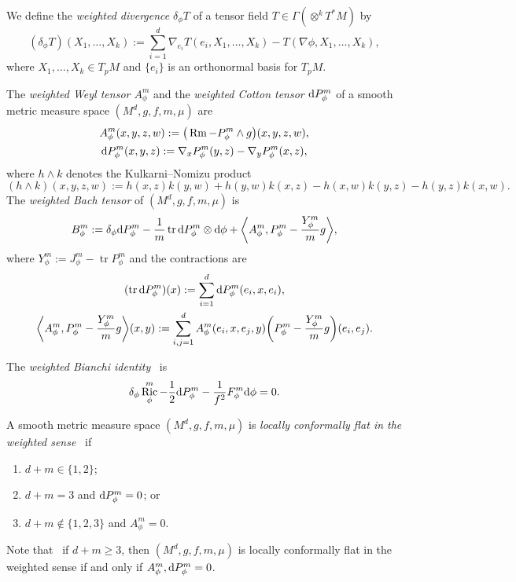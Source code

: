\documentclass[pdftex]{sigma}
\DeclareMathOperator{\tr}{tr}
\DeclareMathOperator{\Ric}{Ric}
\DeclareMathOperator{\Rm}{Rm}
\newcommand{\lp}{\langle}
\newcommand{\rp}{\rangle}
\newcommand{\del}{\delta_{\phi}}
\newcommand{\ric}{\Ric_{\phi}^m}
\numberwithin{equation}{section}
\begin{document}
We define the \emph{weighted divergence} $\delta_\phi T$ of a tensor field $T \in \Gamma(\otimes^k T^*M)$ by
\[
(\delta_\phi T)(X_1,\dots,X_k):=\sum\limits_{i=1}^d \nabla_{e_i} T(e_i,X_1,\dots,X_k)-T(\nabla\phi,X_1,\dots,X_k),
\]
where $X_1,\dots,X_k\in T_p M$ and $\{e_i\}$ is an orthonormal basis for $T_p M$.

The \emph{weighted Weyl tensor $A_\phi^m$} and the \emph{weighted Cotton tensor ${\rm d}P_\phi^m$} of a smooth metric measure space $(M^d,g,f,m,\mu)$ are
\begin{gather*}
 A_\phi^m(x,y,z,w) := \big(\Rm - P_\phi^m \wedge g\big)(x,y,z,w) ,
 \\
 {\rm d}P_\phi^m(x,y,z) := \nabla_x P_\phi^m(y,z) - \nabla_y P_\phi^m(x,z) ,
\end{gather*}
where $h\wedge k$ denotes the Kulkarni--Nomizu product
\[
(h\wedge k)(x,y,z,w) := h(x,z)k(y,w) + h(y,w)k(x,z) - h(x,w)k(y,z) - h(y,z)k(x,w) .
\]
The \emph{weighted Bach tensor} of $(M^d,g,f,m,\mu)$ is
\[
B_\phi^m := \delta_\phi {\rm d}P_\phi^m - \frac{1}{m}\tr {\rm d}P_\phi^m \otimes {\rm d}\phi + \biggl\lp A_\phi^m, P_\phi^m - \frac{Y_\phi^m}{m}g\biggr\rp ,
\]
where $Y_\phi^m := J_\phi^m - \tr P_\phi^m$ and the contractions are
\begin{gather*}
 (\tr {\rm d}P_\phi^m)(x) := \sum_{i=1}^d {\rm d}P_\phi^m(e_i,x,e_i),
 \\
 \biggl\lp A_\phi^m, P_\phi^m - \frac{Y_\phi^m}{m}g\biggr\rp(x,y) := \sum_{i,j=1}^d A_\phi^m(e_i,x,e_j,y)\biggl(P_\phi^m - \frac{Y_\phi^m}{m}g\biggr)(e_i,e_j).
\end{gather*}

The \emph{weighted Bianchi identity}~\cite{Case2014sd} is
\begin{equation}
\label{intro-weighted-bianchi}
 \del \ric-\frac{1}{2}{\rm d}P_\phi^m-\frac{1}{f^2} F_\phi^m {\rm d}\phi=0.
\end{equation}

{\samepage
A smooth metric measure space $(M^d,g,f,m,\mu)$ is \emph{locally conformally flat in the weighted sense}~\cite{Case2014s} if
\begin{enumerate}[label=$(\roman*)$]\itemsep=0pt
 \item $d+m\in\{1,2\}$;
 \item $d+m=3$ and ${\rm d}P_\phi^m=0$; or
 \item $d+m\not\in\{1,2,3\}$ and $A_\phi^m=0$.
\end{enumerate}

}

Note that~\cite{Case2014s} if $d+m\geq 3$, then $(M^d,g,f,m,\mu)$ is locally conformally flat in the weighted sense if and only if $A_\phi^m,{\rm d}P_\phi^m=0$.
\end{document}
